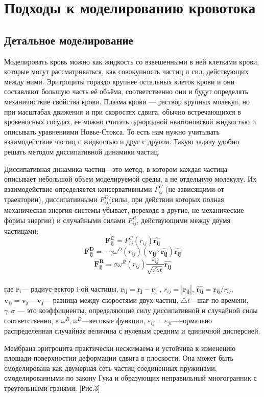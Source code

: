 \section{Подходы к моделированию кровотока}
\subsection{Детальное моделирование}
Моделировать кровь можно как жидкость со взвешенными в ней клетками крови, которые могут рассматриваться, как совокупность частиц и сил, действующих между ними. Эритроциты гораздо крупнее остальных клеток крови и они составляют большую часть её объёма, соответственно они и будут определять механичисткие свойства крови. Плазма крови — раствор крупных молекул, но при масштабах движения и при скоростях сдвига, обычно встречающихся в кровеносных сосудах, ее можно считать однородной ньютоновской жидкостью  и описывать уравнениями Новье-Стокса. То есть нам нужно учитывать взаимодействие частиц с жидкостью и друг с другом. Такую задачу удобно решать методом диссипативной динамики частиц.

Диссипативная динамика частиц—это метод, в котором каждая частица описывает небольшой объем моделируемой среды, а не отдельную молекулу. Их взаимодействие определяется консервативными $F^C_{ij}$ (не зависящими от 
траектории), диссипативными $F^D_{ij}$(силы, при действии которых полная механическая энергия  системы убывает, переходя в другие, не механические формы энергии) и случайными силами $F^R_{ij}$, действующими между двумя частицами:
$$\mathbf{F^C_{ij}}=F^C_{ij}(r_{ij})\mathbf{\hat{r_{ij}}}$$
$$\mathbf{F^D_{ij}}=-\gamma \omega^D(r_{ij}) (\mathbf{v_{ij}} \cdot \mathbf{\hat{r_{ij}}})\mathbf{\hat{r_{ij}}}$$
$$\mathbf{F^R_{ij}}=\sigma \omega^R(r_{ij}) \dfrac{\varepsilon_{ij}}{\sqrt{\bigtriangleup t}} \mathbf{\hat{r_{ij}}}$$\\
где $\mathbf{r_{i}}$— радиус-вектор i-ой частицы, $\mathbf{r_{ij}}=\mathbf{r_{j}} - \mathbf{r_{j}}$ ,
$r_{ij}=|\mathbf{r_{ij}}|$,
$\mathbf{\hat{r_{ij}}}=\mathbf{r_{ij}}/{r_{ij}}$,
$\mathbf{v_{ij}}=\mathbf{v_{j} - \mathbf{v_{j}}}$— разница между скоростями двух частиц, $\bigtriangleup t$—шаг по времени, $\gamma, \sigma$ — это  коэффициенты, определяющие силу диссипативной и случайной силы соответственно, а $\omega^R,\omega^D$—весовые функции,
${\varepsilon_{ij}={\varepsilon_{ji}}}$—нормально распределенная случайная величина с нулевым средним и единичной дисперсией.

Мембрана эритроцита практически несжимаема и устойчива к изменению площади поверхностии деформации сдвига в плоскости. Она может быть смоделирована как двумерная сеть частиц соединенных пружинами, смоделированными по закону Гука и образующих неправильный многогранник с треугольными гранями. [Рис.3]

